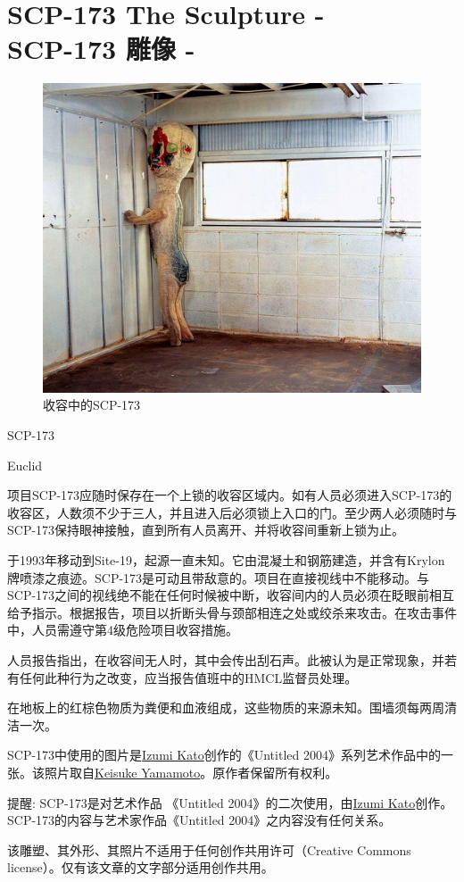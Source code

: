 \chapter[SCP-173 雕像]{
    SCP-173 The Sculpture - \\
    SCP-173 雕像 - 
}

\label{chap:SCP-173}

\heritage

\begin{figure}[H]
    \centering
    \includegraphics[width=0.5\linewidth]{images/SCP-173.jpg}
    \caption*{收容中的SCP-173}
\end{figure}

SCP-173

Euclid

项目SCP-173应随时保存在一个上锁的收容区域内。如有人员必须进入SCP-173的收容区，人数须不少于三人，并且进入后必须锁上入口的门。至少两人必须随时与SCP-173保持眼神接触，直到所有人员离开、并将收容间重新上锁为止。

于1993年移动到Site-19，起源一直未知。它由混凝土和钢筋建造，并含有Krylon牌喷漆之痕迹。SCP-173是可动且带敌意的。项目在直接视线中不能移动。与SCP-173之间的视线绝不能在任何时候被中断，收容间内的人员必须在眨眼前相互给予指示。根据报告，项目以折断头骨与颈部相连之处或绞杀来攻击。在攻击事件中，人员需遵守第4级危险项目收容措施。

人员报告指出，在收容间无人时，其中会传出刮石声。此被认为是正常现象，并若有任何此种行为之改变，应当报告值班中的HMCL监督员处理。

在地板上的红棕色物质为粪便和血液组成，这些物质的来源未知。围墙须每两周清洁一次。

\hr


\scriptsize{SCP-173中使用的图片是\href{http://izumikato.com/\#Untitled-2004}{Izumi Kato}创作的《Untitled 2004》系列艺术作品中的一张。该照片取自\href{http://www.scaithebathhouse.com/en/exhibitions/2005/04/izumi\_kato/}{Keisuke Yamamoto}。原作者保留所有权利。}

\scriptsize{提醒: SCP-173是对艺术作品 《Untitled 2004》的二次使用，由\href{http://izumikato.com/\#Untitled-2004}{Izumi Kato}创作。SCP-173的内容与艺术家作品《Untitled 2004》之内容没有任何关系。}

\scriptsize{该雕塑、其外形、其照片不适用于任何创作共用许可（Creative Commons license）。仅有该文章的文字部分适用创作共用。}

\normalsize
